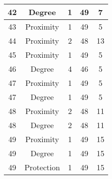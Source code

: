 \documentclass[results.tex]{subfiles}
\begin{document}
\begin{center}
\begin{tabular}{| c || c | c | c | c |}
            \hline
            42                      & Degree                       & 1                      & 49                      & 7                    \\
            \hline
            43                      & Proximity                    & 1                      & 49                      & 5                    \\
            \hline
            44                      & Proximity                    & 2                      & 48                      & 13                   \\
            \hline
            45                      & Proximity                    & 1                      & 49                      & 5                    \\
            \hline
            46                      & Degree                       & 4                      & 46                      & 5                    \\
            \hline
            47                      & Proximity                    & 1                      & 49                      & 5                    \\
            \hline
            47                      & Degree                       & 1                      & 49                      & 5                    \\
            \hline
            48                      & Proximity                    & 2                      & 48                      & 11                   \\
            \hline
            48                      & Degree                       & 2                      & 48                      & 11                   \\
            \hline
            49                      & Proximity                    & 1                      & 49                      & 15                   \\
            \hline
            49                      & Degree                       & 1                      & 49                      & 15                   \\
            \hline
            49                      & Protection                   & 1                      & 49                      & 15                   \\
            \hline
        \end{tabular}
    \end{center}
\end{document}
